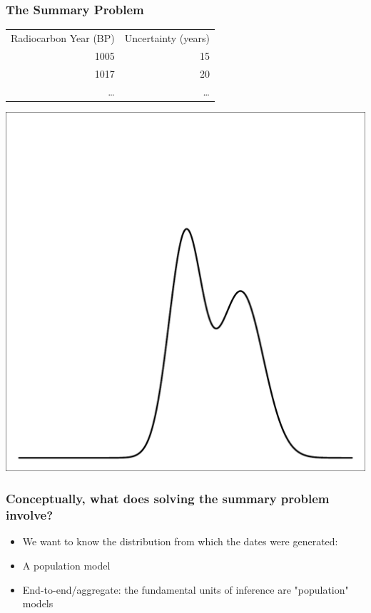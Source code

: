 \documentclass{beamer}
\begin{document}
\begin{frame}[t]
  \frametitle{The Summary Problem}
\begin{center}
	\begin{tabular}{ r r }
		Radiocarbon Year (BP) & Uncertainty (years)\\
		1005 & 15\\
		1017 & 20\\
		\ldots & \ldots\\
	\end{tabular}
	\includegraphics[width=.5\textwidth]{bayesian_update_illustration_th2.pdf}\\
\end{center}
\end{frame}

\begin{frame}[t]
  \frametitle{Conceptually, what does solving the summary problem involve?}
  \begin{itemize}
    \item We want to know the distribution from which the dates were generated:
    \pause
    \item A population model
    \pause
    \item End-to-end/aggregate: the fundamental units of inference are "population" models
  \end{itemize}
\end{frame}
\end{document}

